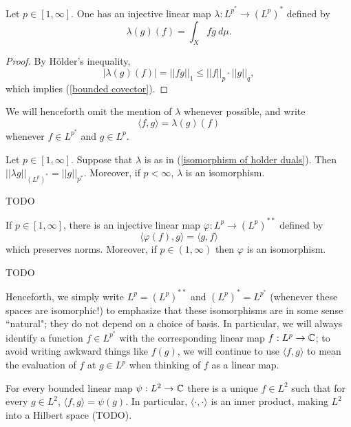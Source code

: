 \begin{lemma}
Let $p \in [1, \infty]$.
One has an injective linear map $\lambda: L^{p^*} \to (L^p)^*$ defined by
\begin{equation}
\label{isomorphism of holder duals}
\lambda(g)(f) = \int_X f\overline g ~d\mu.
\end{equation}
\end{lemma}
\begin{proof}
By H\"older's inequality,
$$|\lambda(g)(f)| = ||fg||_1 \leq ||f||_p \cdot ||g||_q,$$
which implies (\ref{bounded covector}).
\end{proof}

We will henceforth omit the mention of $\lambda$ whenever possible, and write
$$\langle f, g\rangle = \lambda(g)(f)$$
whenever $f \in L^{p^*}$ and $g \in L^p$.

\begin{theorem}
Let $p \in [1, \infty]$.
Suppose that $\lambda$ is as in (\ref{isomorphism of holder duals}).
Then $||\lambda g||_{(L^p)^*} = ||g||_{p^*}$.
Moreover, if $p < \infty$, $\lambda$ is an isomorphism.
\end{theorem}
TODO

\begin{corollary}
If $p \in [1, \infty]$, there is an injective linear map $\varphi: L^p \to (L^p)^{**}$ defined by
$$\langle \varphi(f), g\rangle = \langle g, f\rangle$$
which preserves norms. Moreover, if $p \in (1, \infty)$ then $\varphi$ is an isomorphism.
\end{corollary}
TODO

Henceforth, we simply write $L^p = (L^p)^{**}$ and $(L^p)^* = L^{p^*}$ (whenever these spaces are isomorphic!) to emphasize that these isomorphisms are in some sense ``natural"; they do not depend on a choice of basis.
In particular, we will always identify a function $f \in L^{p^*}$ with the corresponding linear map $f: L^p \to \mathbb{C}$; to avoid writing awkward things like $f(g)$, we will continue to use $\langle f, g\rangle$ to mean the evaluation of $f$ at $g \in L^p$ when thinking of $f$ as a linear map.

\begin{corollary}
For every bounded linear map $\psi: L^2 \to \mathbb{C}$ there is a unique $f \in L^2$ such that for every $g \in L^2$, $\langle f, g\rangle = \psi(g)$.
In particular, $\langle \cdot, \cdot \rangle$ is an inner product, making $L^2$ into a Hilbert space (TODO).
\end{corollary}

